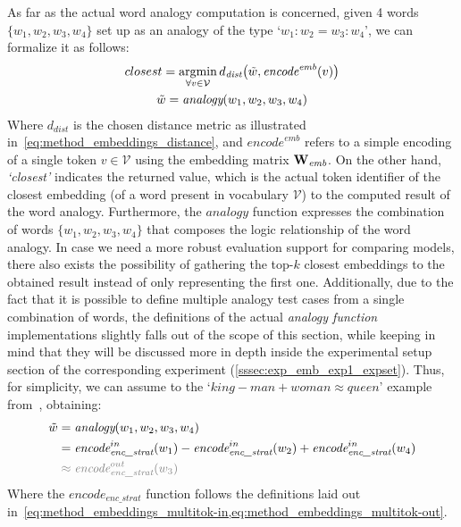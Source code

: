 As far as the actual word analogy computation is concerned, given 4 words $\{w_1, w_2, w_3, w_4\}$ set up as an analogy of the type `$w_1 : w_2 = w_3 : w_4$', we can formalize it as follows:
\begin{equation}
    \label{eq:method_embeddings_analogy}
    \begin{gathered}
        closest = \operatornamewithlimits{argmin}_{\forall v \in \mathcal{V}} d_{\textit{dist}}\bigl(\tilde w, \textit{encode}^{\textit{emb}}(v)\bigr) \\
        \tilde w = \textit{analogy}(w_1, w_2, w_3, w_4)
    \end{gathered}
\end{equation}
Where $d_{\textit{dist}}$ is the chosen distance metric as illustrated in~\cref{eq:method_embeddings_distance}, and $\textit{encode}^{\textit{emb}}$ refers to a simple encoding of a single token $v \in \mathcal{V}$ using the embedding matrix $\bm{\mathbf{W}}_{\textit{emb}}$.
On the other hand, \emph{`closest'} indicates the returned value, which is the actual token identifier of the closest embedding (of a word present in vocabulary $\mathcal{V}$) to the computed result of the word analogy.
Furthermore, the $\textit{analogy}$ function expresses the combination of words $\{w_1, w_2, w_3, w_4\}$ that composes the logic relationship of the word analogy.
In case we need a more robust evaluation support for comparing models, there also exists the possibility of gathering the top-$k$ closest embeddings to the obtained result instead of only representing the first one.
Additionally, due to the fact that it is possible to define multiple analogy test cases from a single combination of words, the definitions of the actual \emph{analogy function} implementations slightly falls out of the scope of this section, while keeping in mind that they will be discussed more in depth inside the experimental setup section of the corresponding experiment (\cref{sssec:exp_emb_exp1_expset}).
Thus, for simplicity, we can assume to  the  `$king - man + woman \approx queen$' example from~\citet{mikolov2013}, obtaining:
\begin{equation}
    \label{eq:method_embeddings_analogy-function}
    \begin{aligned}
        \tilde w &= \textit{analogy}(w_1, w_2, w_3, w_4) \\
        &= {\textit{encode}}_{\textit{enc\_strat}}^{in}(w_1) - {\textit{encode}}_{\textit{enc\_strat}}^{in}(w_2) + {\textit{encode}}_{\textit{enc\_strat}}^{in}(w_4) \\
        &\color{gray} \approx {\textit{encode}}_{\textit{enc\_strat}}^{out}(w_3) 
    \end{aligned}
\end{equation}
Where the ${\textit{encode}}_{\textit{enc\_strat}}$ function follows the definitions laid out in~\cref{eq:method_embeddings_multitok-in,eq:method_embeddings_multitok-out}.

